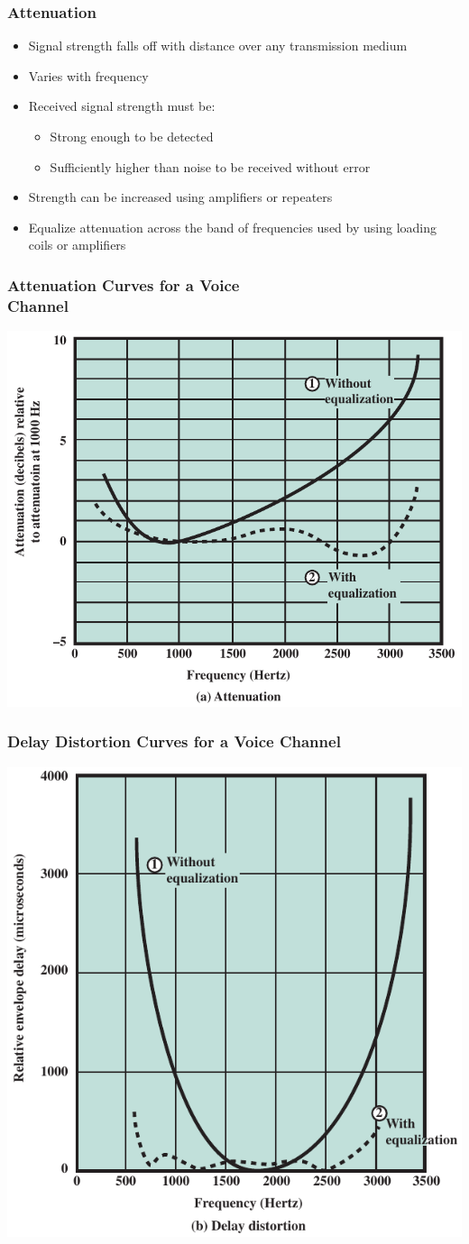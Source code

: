 \documentclass[pdflatex,compress]{beamer}
\begin{document}
\begin{frame}
	\frametitle{Attenuation}
	\begin{itemize}
		\item Signal strength falls off with distance over any transmission medium
		\item Varies with frequency
		\item Received signal strength must be:
		\begin{itemize}
			\item Strong enough to be detected
			\item Sufficiently higher than noise to be received without error
		\end{itemize}
		\item Strength can be increased using amplifiers or repeaters
		\item Equalize attenuation across the band of frequencies used by using loading coils or amplifiers
	\end{itemize}
\end{frame}

\begin{frame}
	\frametitle{Attenuation Curves for a Voice\\Channel}
	\begin{center}
		\includegraphics[width=0.7\linewidth]{img/img15}
	\end{center}
\end{frame}

\begin{frame}
	\frametitle{Delay Distortion Curves for a Voice Channel}
	\begin{center}
		\includegraphics[width=0.6\linewidth]{img/img16}
	\end{center}
\end{frame}
\end{document}
